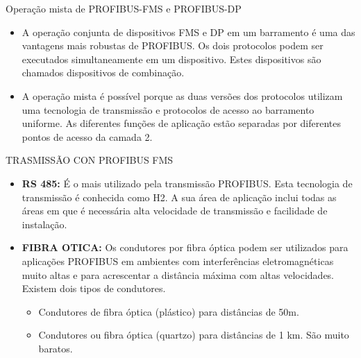\documentclass{beamer}
\begin{document}
\begin{frame}{Operação mista de PROFIBUS-FMS e PROFIBUS-DP}

\begin{itemize}
\item A operação conjunta de dispositivos FMS e DP em um barramento é uma das vantagens mais robustas de PROFIBUS. Os dois protocolos podem ser executados simultaneamente em um dispositivo. Estes dispositivos são chamados dispositivos de combinação.
 
\item A operação mista é possível porque as duas versões dos protocolos utilizam uma tecnologia de transmissão e protocolos de acesso ao barramento uniforme. As diferentes funções de aplicação estão separadas por diferentes pontos de acesso da camada 2.
\end{itemize}

\end{frame}

\begin{frame}{TRASMISSÃO CON PROFIBUS FMS}
\begin{itemize}
\item \textbf{RS 485:} É o mais utilizado pela transmissão PROFIBUS. Esta tecnologia de transmissão é conhecida como H2. A sua área de aplicação inclui todas as áreas em que é necessária alta velocidade de transmissão e facilidade de instalação.

\item \textbf{FIBRA OTICA:} Os condutores por fibra óptica podem ser utilizados para aplicações PROFIBUS em ambientes com interferências eletromagnéticas muito altas e para acrescentar a distância máxima com altas velocidades. Existem dois tipos de condutores. 
\begin{itemize}
\item Condutores de fibra óptica (plástico) para distâncias de 50m. 
\item Condutores ou fibra óptica (quartzo) para distâncias de 1 km. São muito baratos. 

\end{itemize}
\end{itemize}

\end{frame}
\end{document}
